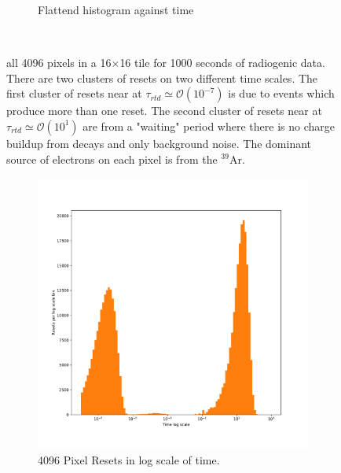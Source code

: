\begin{figure}
\begin{subfigure}{.5\textwidth}
  \caption{Flattend histogram against time}
\end{subfigure}
\caption{all 4096 pixels in a 16$\times$16 tile for 1000 seconds of radiogenic data. 
There are two clusters of resets on two different time scales.
The first cluster of resets near at $\tau_{rtd} \simeq \mathcal{O}(10^{-7})$ is due to events which produce more than one reset.
The second cluster of resets near at $\tau_{rtd} \simeq \mathcal{O}(10^{1})$ are from a "waiting" period where there is no charge buildup from decays and only background noise.
The dominant source of electrons on each pixel is from the $^{39}$Ar.
}
~\label{fig:radiogenic_rtd_timescales}
\end{figure}

\begin{figure}
\centering
\begin{subfigure}{.5\textwidth}
  \centering
  \includegraphics[width=\textwidth]{images/radiogenicRTDtimescale_1d.pdf}
  \caption{4096 Pixel Resets in log scale of time.}
\end{subfigure}%
\begin{subfigure}{.5\textwidth}
  \centering

\end{subfigure}
\end{figure}
